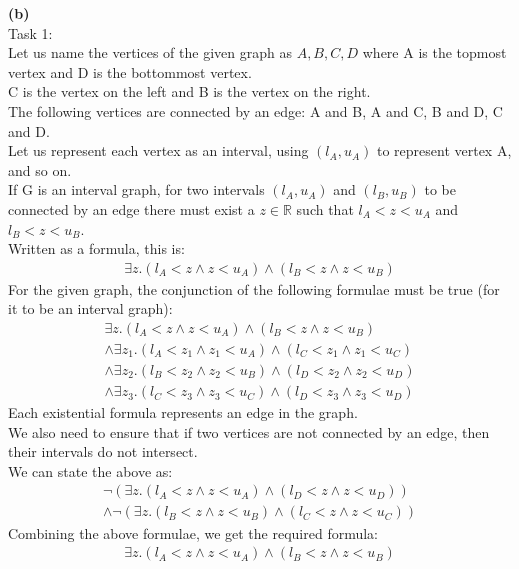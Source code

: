 \documentclass[12pt,letterpaper, onecolumn]{exam}
\begin{document}
\begin{questions}
	\textbf{(b)} \\
	Task 1: \\
	Let us name the vertices of the given graph as $ A, B, C, D $ where A is the topmost vertex and D is the bottommost vertex. \\
	C is the vertex on the left and B is the vertex on the right. \\
	The following vertices are connected by an edge: A and B, A and C, B and D, C and D. \\
	Let us represent each vertex as an interval, using $ (l_{A}, u_{A}) $ to represent vertex A, and so on. \\
	If G is an interval graph, for two intervals $ (l_{A}, u_{A}) $ and $ (l_{B}, u_{B}) $ to be connected by an edge
	there must exist a $ z \in \mathbb{R} $ such that $ l_{A} < z < u_{A} $ and $ l_{B} < z < u_{B} $. \\
	Written as a formula, this is:
	\begin{align*}
		\exists z. (l_{A} < z \land z < u_{A}) \land (l_{B} < z \land z < u_{B})
	\end{align*}
	For the given graph, the conjunction of the following formulae must be true (for it to be an interval graph):
	\begin{align*}
		\exists z. (l_{A} < z \land z < u_{A}) \land (l_{B} < z \land z < u_{B}) \\
		\land \exists z_1. (l_{A} < z_1 \land z_1 < u_{A}) \land (l_{C} < z_1 \land z_1 < u_{C}) \\
		\land \exists z_2. (l_{B} < z_2 \land z_2 < u_{B}) \land (l_{D} < z_2 \land z_2 < u_{D}) \\
		\land \exists z_3. (l_{C} < z_3 \land z_3 < u_{C}) \land (l_{D} < z_3 \land z_3 < u_{D})
	\end{align*}
	Each existential formula represents an edge in the graph. \\
	We also need to ensure that if two vertices are not connected by an edge, then their intervals do not intersect. \\
	We can state the above as:
	\begin{align*}
		\neg (\exists z. (l_{A} < z \land z < u_{A}) \land (l_{D} < z \land z < u_{D})) \\
		\land \neg (\exists z. (l_{B} < z \land z < u_{B}) \land (l_{C} < z \land z < u_{C}))
	\end{align*}
	Combining the above formulae, we get the required formula:
	\begin{align*}
		\exists z. (l_{A} < z \land z < u_{A}) \land (l_{B} < z \land z < u_{B}) \\

\end{align*}
\end{questions}
\end{document}
